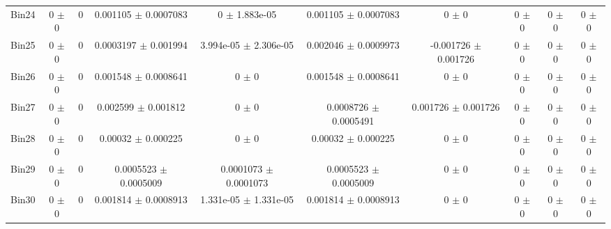 \begin{tabular}{@{\extracolsep{4pt}}lccccccccc@{}}
     Bin24 & 0 $\pm$ 0 & 0 & 0.001105 $\pm$ 0.0007083 & 0 $\pm$ 1.883e-05 & 0.001105 $\pm$ 0.0007083 & 0 $\pm$ 0 & 0 $\pm$ 0 & 0 $\pm$ 0 & 0 $\pm$ 0 \\ 
     Bin25 & 0 $\pm$ 0 & 0 & 0.0003197 $\pm$ 0.001994 & 3.994e-05 $\pm$ 2.306e-05 & 0.002046 $\pm$ 0.0009973 & -0.001726 $\pm$ 0.001726 & 0 $\pm$ 0 & 0 $\pm$ 0 & 0 $\pm$ 0 \\ 
     Bin26 & 0 $\pm$ 0 & 0 & 0.001548 $\pm$ 0.0008641 & 0 $\pm$ 0 & 0.001548 $\pm$ 0.0008641 & 0 $\pm$ 0 & 0 $\pm$ 0 & 0 $\pm$ 0 & 0 $\pm$ 0 \\ 
     Bin27 & 0 $\pm$ 0 & 0 & 0.002599 $\pm$ 0.001812 & 0 $\pm$ 0 & 0.0008726 $\pm$ 0.0005491 & 0.001726 $\pm$ 0.001726 & 0 $\pm$ 0 & 0 $\pm$ 0 & 0 $\pm$ 0 \\ 
     Bin28 & 0 $\pm$ 0 & 0 & 0.00032 $\pm$ 0.000225 & 0 $\pm$ 0 & 0.00032 $\pm$ 0.000225 & 0 $\pm$ 0 & 0 $\pm$ 0 & 0 $\pm$ 0 & 0 $\pm$ 0 \\ 
     Bin29 & 0 $\pm$ 0 & 0 & 0.0005523 $\pm$ 0.0005009 & 0.0001073 $\pm$ 0.0001073 & 0.0005523 $\pm$ 0.0005009 & 0 $\pm$ 0 & 0 $\pm$ 0 & 0 $\pm$ 0 & 0 $\pm$ 0 \\ 
     Bin30 & 0 $\pm$ 0 & 0 & 0.001814 $\pm$ 0.0008913 & 1.331e-05 $\pm$ 1.331e-05 & 0.001814 $\pm$ 0.0008913 & 0 $\pm$ 0 & 0 $\pm$ 0 & 0 $\pm$ 0 & 0 $\pm$ 0 \\ 
\hline\hline
  \end{tabular}

